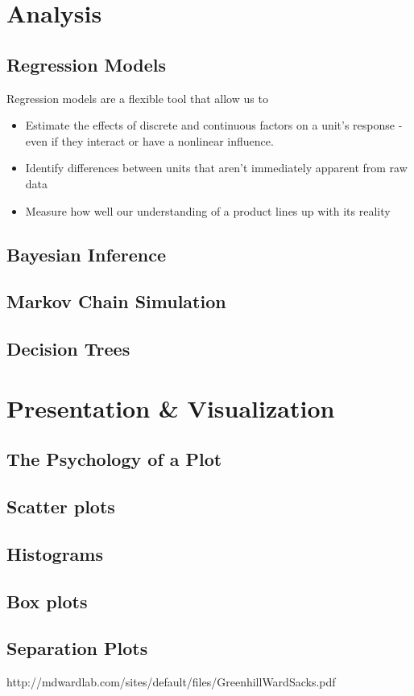 \documentclass[11pt,a4paper,article]{memoir} %
\begin{document}
\section{Analysis}
\subsection*{Regression Models}
Regression models are a flexible tool that allow us to
\begin{itemize}
\item Estimate the effects of discrete and continuous factors on a unit's response - even if they interact or have a nonlinear influence.
\item Identify differences between units that aren't immediately apparent from raw data
\item Measure how well our understanding of a product lines up with its reality
\end{itemize}
\subsection*{Bayesian Inference}
\subsection*{Markov Chain Simulation}
\subsection*{Decision Trees}

\section{Presentation \& Visualization}
\subsection{The Psychology of a Plot}
\subsection{Scatter plots}
\subsection{Histograms}
\subsection{Box plots}
\subsection{Separation Plots}
http://mdwardlab.com/sites/default/files/GreenhillWardSacks.pdf
\end{document}

